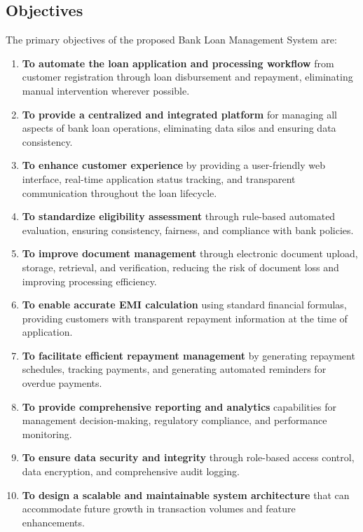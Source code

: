 \documentclass[12pt,a4paper,oneside]{report}
\begin{document}
\subsection{Objectives}

The primary objectives of the proposed Bank Loan Management System are:

\begin{enumerate}
  \item \textbf{To automate the loan application and processing workflow} from customer registration through loan disbursement and repayment, eliminating manual intervention wherever possible.
  \item \textbf{To provide a centralized and integrated platform} for managing all aspects of bank loan operations, eliminating data silos and ensuring data consistency.
  \item \textbf{To enhance customer experience} by providing a user-friendly web interface, real-time application status tracking, and transparent communication throughout the loan lifecycle.
  \item \textbf{To standardize eligibility assessment} through rule-based automated evaluation, ensuring consistency, fairness, and compliance with bank policies.
  \item \textbf{To improve document management} through electronic document upload, storage, retrieval, and verification, reducing the risk of document loss and improving processing efficiency.
  \item \textbf{To enable accurate EMI calculation} using standard financial formulas, providing customers with transparent repayment information at the time of application.
  \item \textbf{To facilitate efficient repayment management} by generating repayment schedules, tracking payments, and generating automated reminders for overdue payments.
  \item \textbf{To provide comprehensive reporting and analytics} capabilities for management decision-making, regulatory compliance, and performance monitoring.
  \item \textbf{To ensure data security and integrity} through role-based access control, data encryption, and comprehensive audit logging.
  \item \textbf{To design a scalable and maintainable system architecture} that can accommodate future growth in transaction volumes and feature enhancements.
\end{enumerate}
\end{document}
